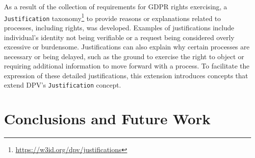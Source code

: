 \documentclass{IOS-Book-Article}     %
\begin{document}
As a result of the collection of requirements for GDPR rights exercising, a \texttt{Justification} taxonomy\footnote{\url{https://w3id.org/dpv/justifications}} to provide reasons or explanations related to processes, including rights, was developed.
Examples of justifications include individual's identity not being verifiable or a request being considered overly excessive or burdensome.
Justifications can also explain why certain processes are necessary or being delayed, such as the ground to exercise the right to object or requiring additional information to move forward with a process.
To facilitate the expression of these detailed justifications, this extension introduces concepts that extend DPV's \texttt{Justification} concept.

\section{Conclusions and Future Work}
\label{sec:conclusions}



\end{document}
